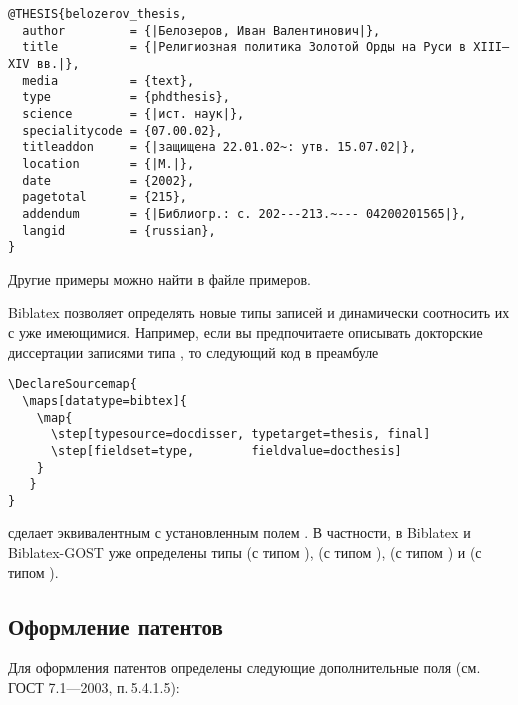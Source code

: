 \documentclass[10pt,a4paper,headings=small,numbers=enddot,english,russian]{ltxdockit}
\newcommand*{\biblatex}{Biblatex\xspace}
\newcommand*{\biblatexgost}{Biblatex-GOST\xspace}
\newcommand*{\gostbibname}[1][]{ГОСТ#1 7.1---2003\xspace}
\newcommand*{\gostbibref}[2][]{\gostbibname[#1], п.\,#2\xspace}
\begin{document}
\begin{lstlisting}[style=bibtex,escapechar=|]
@THESIS{belozerov_thesis,
  author         = {|Белозеров, Иван Валентинович|},
  title          = {|Религиозная политика Золотой Орды на Руси в XIII—XIV вв.|},
  media          = {text},
  type           = {phdthesis},
  science        = {|ист. наук|},
  specialitycode = {07.00.02},
  titleaddon     = {|защищена 22.01.02~: утв. 15.07.02|},
  location       = {|М.|},
  date           = {2002},
  pagetotal      = {215},
  addendum       = {|Библиогр.: с. 202---213.~--- 04200201565|},
  langid         = {russian},
}
\end{lstlisting}

Другие примеры можно найти в файле примеров.

\biblatex позволяет определять новые типы записей и динамически соотносить их
с уже имеющимися.
Например, если вы предпочитаете описывать докторские диссертации записями типа
, то следующий код в преамбуле

\begin{lstlisting}[style=latex]
\DeclareSourcemap{
  \maps[datatype=bibtex]{
    \map{
      \step[typesource=docdisser, typetarget=thesis, final]
      \step[fieldset=type,        fieldvalue=docthesis]
    }
   }
}
\end{lstlisting}

\noindent сделает  эквивалентным  с установленным полем
.
В частности, в \biblatex и \biblatexgost уже определены типы  (с
типом ),  (с типом ), 
(с типом ) и  (с типом ). 


\subsection{Оформление патентов}
\label{sec:patent}

Для оформления патентов определены следующие дополнительные поля (см. \gostbibref{5.4.1.5}):
\end{document}
